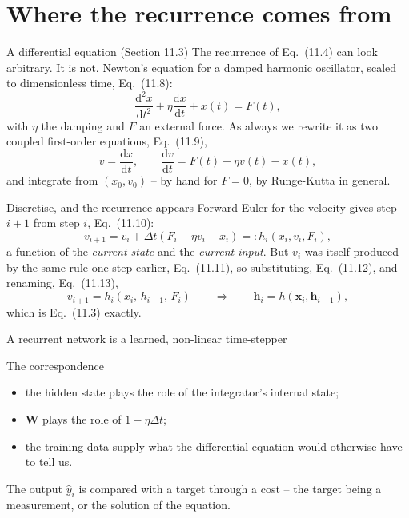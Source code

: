 \documentclass[10pt,aspectratio=169]{beamer}
\begin{document}
\section{Where the recurrence comes from}


\begin{frame}{A differential equation (Section 11.3)}
The recurrence of Eq.~(11.4) can look arbitrary.  It is not.  Newton's
equation for a damped harmonic oscillator, scaled to dimensionless time,
Eq.~(11.8):
\[
  \frac{\mathrm{d}^2x}{\mathrm{d}t^2}+\eta\frac{\mathrm{d}x}{\mathrm{d}t}+x(t)=F(t),
\]
with $\eta$ the damping and $F$ an external force.  As always we rewrite it
as two coupled first-order equations, Eq.~(11.9),
\[
  v=\frac{\mathrm{d}x}{\mathrm{d}t},\qquad
  \frac{\mathrm{d}v}{\mathrm{d}t}=F(t)-\eta v(t)-x(t),
\]
and integrate from $(x_0,v_0)$ -- by hand for $F=0$, by Runge-Kutta in
general.
\end{frame}

\begin{frame}{Discretise, and the recurrence appears}
Forward Euler for the velocity gives step $i+1$ from step $i$, Eq.~(11.10):
\[
  v_{i+1}=v_i+\Delta t\left(F_i-\eta v_i-x_i\right)=:h_i\!\left(x_i,v_i,F_i\right),
\]
a function of the \emph{current state} and the \emph{current input}.  But
$v_i$ was itself produced by the same rule one step earlier, Eq.~(11.11),
so substituting, Eq.~(11.12), and renaming, Eq.~(11.13),
\[
  v_{i+1}=h_i\!\left(x_i,\,h_{i-1},\,F_i\right)
  \qquad\Longrightarrow\qquad
  \bm{h}_i=h\!\left(\bm{x}_i,\bm{h}_{i-1}\right),
\]
which is Eq.~(11.3) exactly.
\end{frame}

\begin{frame}{A recurrent network is a learned, non-linear time-stepper}
\begin{block}{The correspondence}
\begin{itemize}
  \item the hidden state plays the role of the integrator's internal state;
  \item $\bm{W}$ plays the role of $1-\eta\Delta t$;
  \item the training data supply what the differential equation would
        otherwise have to tell us.
\end{itemize}
\end{block}
\medskip
The output $\hat{y}_i$ is compared with a target through a cost -- the
target being a measurement, or the solution of the equation.
\end{frame}
\end{document}
